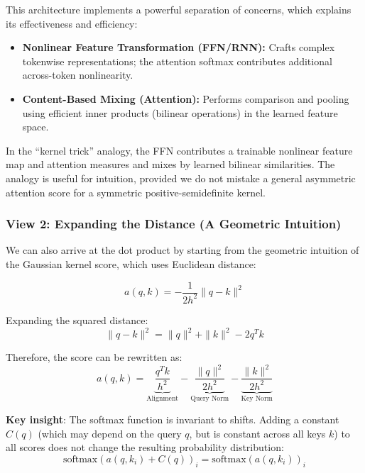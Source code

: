 \documentclass{article}
\begin{document}
This architecture implements a powerful separation of concerns, which explains its effectiveness and efficiency:

\begin{itemize}
    \item \textbf{Nonlinear Feature Transformation (FFN/RNN):} Crafts complex
    tokenwise representations; the attention softmax contributes additional
    across-token nonlinearity.
    \item \textbf{Content-Based Mixing (Attention):} Performs comparison and pooling using efficient inner products (bilinear operations) in the learned feature space.
\end{itemize}

In the ``kernel trick'' analogy, the FFN contributes a trainable nonlinear feature
map and attention measures and mixes by learned bilinear similarities. The analogy is
useful for intuition, provided we do not mistake a general asymmetric attention score
for a symmetric positive-semidefinite kernel.

\subsubsection{View 2: Expanding the Distance (A Geometric Intuition)}

We can also arrive at the dot product by starting from the geometric intuition of the Gaussian kernel score, which uses Euclidean distance:

\begin{equation}
a(q, k) = -\frac{1}{2h^2}\|q - k\|^2
\end{equation}

Expanding the squared distance:
\begin{equation}
\|q - k\|^2 = \|q\|^2 + \|k\|^2 - 2q^T k
\end{equation}

Therefore, the score can be rewritten as:
\begin{equation}
a(q, k) = \underbrace{\frac{q^T k}{h^2}}_{\text{Alignment}} - \underbrace{\frac{\|q\|^2}{2h^2}}_{\text{Query Norm}} - \underbrace{\frac{\|k\|^2}{2h^2}}_{\text{Key Norm}}
\end{equation}

\textbf{Key insight}: The softmax function is invariant to shifts. Adding a constant $C(q)$ (which may depend on the query $q$, but is constant across all keys $k$) to all scores does not change the resulting probability distribution:
\begin{equation}
\text{softmax}(a(q, k_i) + C(q))_i = \text{softmax}(a(q, k_i))_i
\end{equation}
\end{document}
